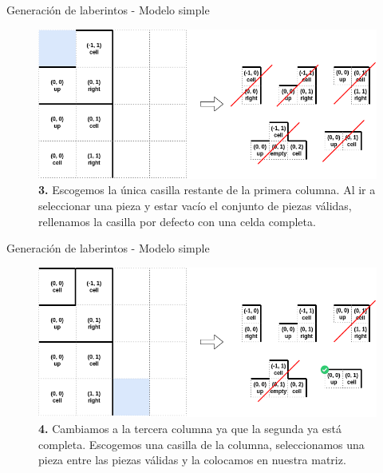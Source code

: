 \documentclass{beamer}
\begin{document}
    \begin{frame}{Generación de laberintos - Modelo simple \scriptsize{\hfill \secname}}
        \begin{figure}[H]
        \centering
            \includegraphics[scale=0.375]{img/paso3.png}
            \caption{\textbf{3.} Escogemos la única casilla restante de la primera columna. Al ir a seleccionar una pieza y estar vacío el conjunto de piezas válidas, rellenamos la casilla por defecto con una celda completa.}
        \end{figure}
    \end{frame}
    
    \begin{frame}{Generación de laberintos - Modelo simple \scriptsize{\hfill \secname}}
        \begin{figure}[H]
        \centering
            \includegraphics[scale=0.375]{img/paso4.png}
            \caption{\textbf{4.} Cambiamos a la tercera columna ya que la segunda ya está completa. Escogemos una casilla de la columna, seleccionamos una pieza entre las piezas válidas y la colocamos en nuestra matriz.}
        \end{figure}
    \end{frame}
    
\end{document}
